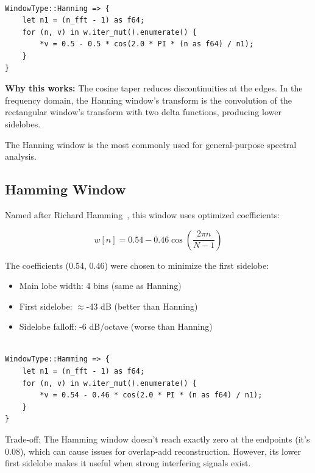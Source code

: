 \begin{lstlisting}[caption={Hanning window implementation}]

WindowType::Hanning => {
    let n1 = (n_fft - 1) as f64;
    for (n, v) in w.iter_mut().enumerate() {
        *v = 0.5 - 0.5 * cos(2.0 * PI * (n as f64) / n1);
    }
}
\end{lstlisting}

\textbf{Why this works:} The cosine taper reduces discontinuities at
the edges. In the frequency domain, the Hanning window's transform is
the convolution of the rectangular window's transform with two delta
functions, producing lower sidelobes.

The Hanning window is the most commonly used for general-purpose
spectral analysis.

\subsection{Hamming Window}\label{subsec:hamming_window}

Named after Richard Hamming~\cite{harris1978use}, this window uses
optimized coefficients:

\begin{equation}
  \label{eq:hamming_window}
  w[n] = 0.54 - 0.46\cos\left(\frac{2\pi n}{N-1}\right)
\end{equation}

The coefficients (0.54, 0.46) were chosen to minimize the first sidelobe:
\begin{itemize}
  \item Main lobe width: 4 bins (same as Hanning)
  \item First sidelobe: $\approx$-43 dB (better than Hanning)
  \item Sidelobe falloff: -6 dB/octave (worse than Hanning)
\end{itemize}

\begin{lstlisting}[caption={Hamming window implementation}]

WindowType::Hamming => {
    let n1 = (n_fft - 1) as f64;
    for (n, v) in w.iter_mut().enumerate() {
        *v = 0.54 - 0.46 * cos(2.0 * PI * (n as f64) / n1);
    }
}
\end{lstlisting}

Trade-off: The Hamming window doesn't reach exactly zero at the
endpoints (it's 0.08), which can cause issues for overlap-add
reconstruction. However, its lower first sidelobe makes it useful
when strong interfering signals exist.

